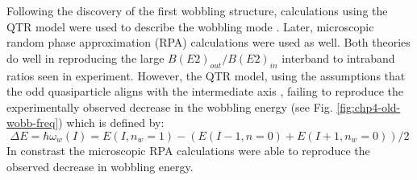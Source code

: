 Following the discovery of the first wobbling structure, calculations using the QTR model were used to describe the wobbling mode \cite{oldQTRWobblingTheory1,oldQTRWobblingTheory2,oldQTRWobblingTheory3,oldQTRWobblingTheory4}. Later, microscopic random phase approximation (RPA) calculations \cite{wobblingRPAMatsuzaki,wobblingRPAMatsuzaki2,wobblingRPAOi,wobblingRPAShimizu,wobblingRPAshoji} were used as well. Both theories do well in reproducing the large $B(E2)_{out}/B(E2)_{in}$ interband to intraband ratios seen in experiment. However, the QTR model, using the assumptions that the odd quasiparticle aligns with the intermediate axis \cite{oldQTRWobblingTheory1,oldQTRWobblingTheory2,oldQTRWobblingTheory3,oldQTRWobblingTheory4}, failing to reproduce the experimentally observed decrease in the wobbling energy (see Fig. \ref{fig:chp4-old-wobb-freq}) which is defined by:
\begin{equation}
\label{eqn:chp4-wobb-freq}
\Delta{}E=\hbar\omega_w(I)=E(I,n_w=1)-(E(I-1,n=0)+E(I+1,n_w=0))/2
\end{equation}
In constrast the microscopic RPA calculations were able to reproduce the observed decrease in wobbling energy.
